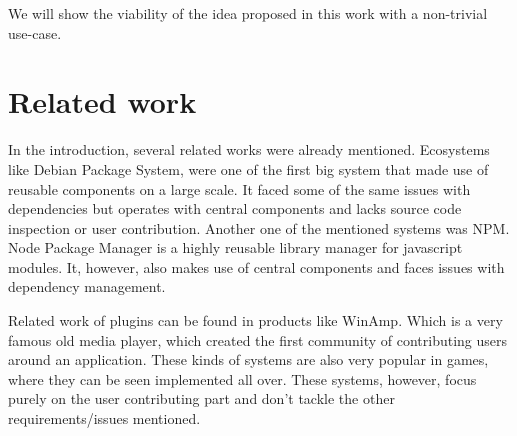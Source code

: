 We will show the viability of the idea proposed in this work with a non-trivial use-case.

\section{Related work}
In the introduction, several related works were already mentioned. Ecosystems like Debian Package System, were one of the first big system that made use of reusable components on a large scale. It faced some of the same issues with dependencies but operates with central components and lacks source code inspection or user contribution. Another one of the mentioned systems was NPM. Node Package Manager is a highly reusable library manager for javascript modules. It, however, also makes use of central components and faces issues with dependency management.

Related work of plugins can be found in products like WinAmp. Which is a very famous old media player, which created the first community of contributing users around an application. These kinds of systems are also very popular in games, where they can be seen implemented all over. These systems, however, focus purely on the user contributing part and don't tackle the other requirements/issues mentioned. 

